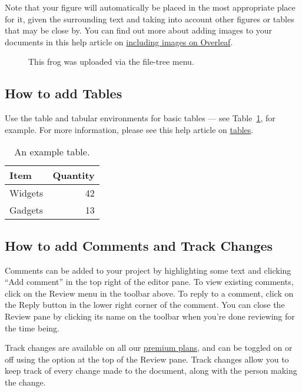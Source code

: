 \documentclass{article}
\begin{document}
	Note that your figure will automatically be placed in the most appropriate place for it, given the surrounding text and taking into account other figures or tables that may be close by. You can find out more about adding images to your documents in this help article on \href{https://www.overleaf.com/learn/how-to/Including_images_on_Overleaf}{including images on Overleaf}.
	
	\begin{figure}
		\centering
		\caption{\label{fig:frog}This frog was uploaded via the file-tree menu.}
	\end{figure}
	
	\subsection{How to add Tables}
	
	Use the table and tabular environments for basic tables --- see Table~\ref{tab:widgets}, for example. For more information, please see this help article on \href{https://www.overleaf.com/learn/latex/tables}{tables}. 
	
	\begin{table}
		\centering
		\begin{tabular}{l|r}
			Item & Quantity \\\hline
			Widgets & 42 \\
			Gadgets & 13
		\end{tabular}
		\caption{\label{tab:widgets}An example table.}
	\end{table}
	
	\subsection{How to add Comments and Track Changes}
	
	Comments can be added to your project by highlighting some text and clicking ``Add comment'' in the top right of the editor pane. To view existing comments, click on the Review menu in the toolbar above. To reply to a comment, click on the Reply button in the lower right corner of the comment. You can close the Review pane by clicking its name on the toolbar when you're done reviewing for the time being.
	
	Track changes are available on all our \href{https://www.overleaf.com/user/subscription/plans}{premium plans}, and can be toggled on or off using the option at the top of the Review pane. Track changes allow you to keep track of every change made to the document, along with the person making the change. 
	
\end{document}
